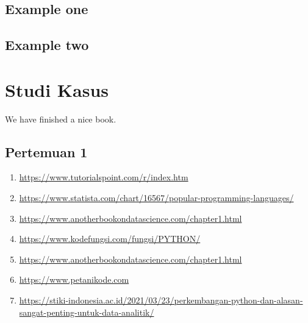 \documentclass[
]{docs}
\providecommand{\tightlist}{%
  \setlength{\itemsep}{0pt}\setlength{\parskip}{0pt}}
\begin{document}
\hypertarget{example-one}{%
\subsection{Example one}\label{example-one}}

\hypertarget{example-two}{%
\subsection{Example two}\label{example-two}}

\hypertarget{studi-kasus}{%
\section{Studi Kasus}\label{studi-kasus}}

We have finished a nice book.

\hypertarget{pertemuan-1}{%
\subsection{Pertemuan 1}\label{pertemuan-1}}

\begin{enumerate}
\def\labelenumi{\arabic{enumi}.}
\tightlist
\item
  \url{https://www.tutorialspoint.com/r/index.htm}
\item
  \url{https://www.statista.com/chart/16567/popular-programming-languages/}
\item
  \url{https://www.anotherbookondatascience.com/chapter1.html}
\item
  \url{https://www.kodefungsi.com/fungsi/PYTHON/}
\item
  \url{https://www.anotherbookondatascience.com/chapter1.html}
\item
  \url{https://www.petanikode.com}
\item
  \url{https://stiki-indonesia.ac.id/2021/03/23/perkembangan-python-dan-alasan-sangat-penting-untuk-data-analitik/}
\end{enumerate}
\end{document}
